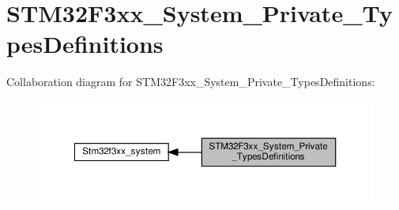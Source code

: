 \hypertarget{group__STM32F3xx__System__Private__TypesDefinitions}{}\section{S\+T\+M32\+F3xx\+\_\+\+System\+\_\+\+Private\+\_\+\+Types\+Definitions}
\label{group__STM32F3xx__System__Private__TypesDefinitions}
Collaboration diagram for S\+T\+M32\+F3xx\+\_\+\+System\+\_\+\+Private\+\_\+\+Types\+Definitions\+:\nopagebreak
\begin{figure}[H]
\begin{center}
\leavevmode
\includegraphics[width=350pt]{group__STM32F3xx__System__Private__TypesDefinitions}
\end{center}
\end{figure}
